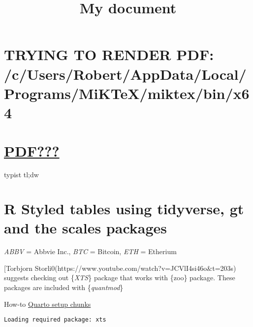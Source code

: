 \documentclass[
  letterpaper,
  DIV=11,
  numbers=noendperiod]{scrartcl}
\title{My document}
\author{}
\date{}
\newenvironment{Shaded}{\begin{snugshade}}{\end{snugshade}}
\newcommand{\FunctionTok}[1]{\textcolor[rgb]{0.28,0.35,0.67}{#1}}
\newcommand{\NormalTok}[1]{\textcolor[rgb]{0.00,0.23,0.31}{#1}}
\newcommand{\SpecialCharTok}[1]{\textcolor[rgb]{0.37,0.37,0.37}{#1}}
\renewcommand*\contentsname{Table of contents}
\newcommand\contentsname{Table of contents}
\begin{document}
\maketitle

\renewcommand*\contentsname{Table of contents}
{
\hypersetup{linkcolor=}
\setcounter{tocdepth}{3}
\tableofcontents
}
\section{TRYING TO RENDER PDF:
/c/Users/Robert/AppData/Local/Programs/MiKTeX/miktex/bin/x64}\label{trying-to-render-pdf-cusersrobertappdatalocalprogramsmiktexmiktexbinx64}

\section{\texorpdfstring{\href{https://www.youtube.com/watch?v=t30sqFch2v0}{PDF???}}{PDF???}}\label{pdf}

typist tl;dw

\section{R Styled tables using tidyverse, gt and the scales
packages}\label{r-styled-tables-using-tidyverse-gt-and-the-scales-packages}

\emph{ABBV} = Abbvie Inc., \emph{BTC} = Bitcoin, \emph{ETH} = Etherium

{[}Torbjorn Storli0(https://www.youtube.com/watch?v=JCVlI4si46o\&t=203s)
suggests checking out \{\emph{XTS}\} package that works with \{zoo\}
package. These packages are included with \{\emph{quantmod}\}

How-to
\href{https://rstudio-conf-2022.github.io/get-started-quarto/materials/03-computation-editors.html\#/knitropts_chunk-defaults}{Quarto
setup chunks}

\begin{Shaded}
\end{Shaded}

\begin{verbatim}
Loading required package: xts
\end{verbatim}
\end{document}
